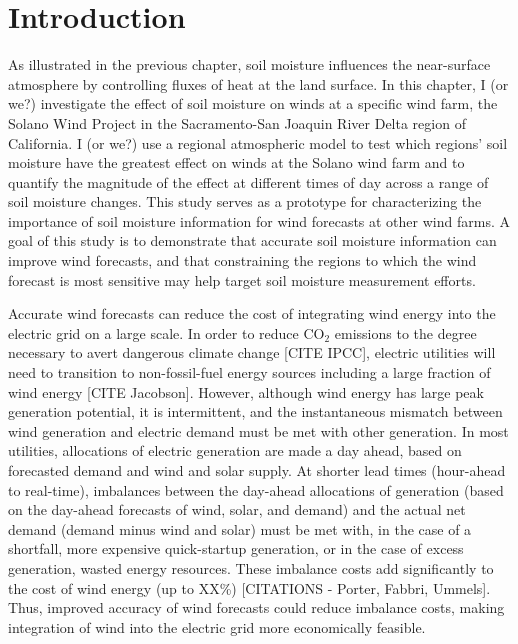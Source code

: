 
%
%
%
%
%

\section{Introduction}

As illustrated in the previous chapter, soil moisture influences the near-surface atmosphere by controlling fluxes of heat at the land surface.  In this chapter, I (or we?) investigate the effect of soil moisture on winds at a specific wind farm, the Solano Wind Project in the Sacramento-San Joaquin River Delta region of California.  I (or we?) use a regional atmospheric model to test which regions' soil moisture have the greatest effect on winds at the Solano wind farm and to quantify the magnitude of the effect at different times of day across a range of soil moisture changes.  This study serves as a prototype for characterizing the importance of soil moisture information for wind forecasts at other wind farms.  A goal of this study is to demonstrate that accurate soil moisture information can improve wind forecasts, and that constraining the regions to which the wind forecast is most sensitive may help target soil moisture measurement efforts.

Accurate wind forecasts can reduce the cost of integrating wind energy into the electric grid on a large scale.  In order to reduce CO$_2$ emissions to the degree necessary to avert dangerous climate change [CITE IPCC], electric utilities will need to transition to non-fossil-fuel energy sources including a large fraction of wind energy [CITE Jacobson].  However, although wind energy has large peak generation potential, it is intermittent, and the instantaneous mismatch between wind generation and electric demand must be met with other generation.  In most utilities, allocations of electric generation are made a day ahead, based on forecasted demand and wind and solar supply.  At shorter lead times (hour-ahead to real-time), imbalances between the day-ahead allocations of generation (based on the day-ahead forecasts of wind, solar, and demand) and the actual net demand (demand minus wind and solar) must be met with, in the case of a shortfall, more expensive quick-startup generation, or in the case of excess generation, wasted energy resources.  These imbalance costs add significantly to the cost of wind energy (up to XX\%) [CITATIONS - Porter, Fabbri, Ummels].  Thus, improved accuracy of wind forecasts could reduce imbalance costs, making integration of wind into the electric grid more economically feasible.

